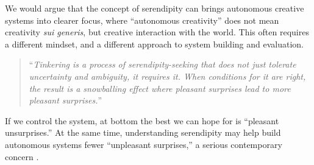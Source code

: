We would argue that the concept of serendipity can brings autonomous
creative systems into clearer focus, where ``autonomous creativity''
does not mean creativity \emph{sui generis}, but creative interaction
with the world.  This often requires a different mindset, and a
different approach to system building and evaluation.
\begin{quote}
``\emph{Tinkering is a process of serendipity-seeking that does not
    just tolerate uncertainty and ambiguity, it requires it.  When
    conditions for it are right, the result is a snowballing effect
    where pleasant surprises lead to more pleasant surprises.}''
  \cite[``Tinkering versus Goals'']{rao2015breaking}


\end{quote}
If we control the system, at bottom the best we can hope for is
``pleasant unsurprises.''  At the same time, understanding serendipity
may help build autonomous systems fewer ``unpleasant surprises,'' a
serious contemporary concern
\cite{philosophy-machine-morality,machine-ethics-status}.
